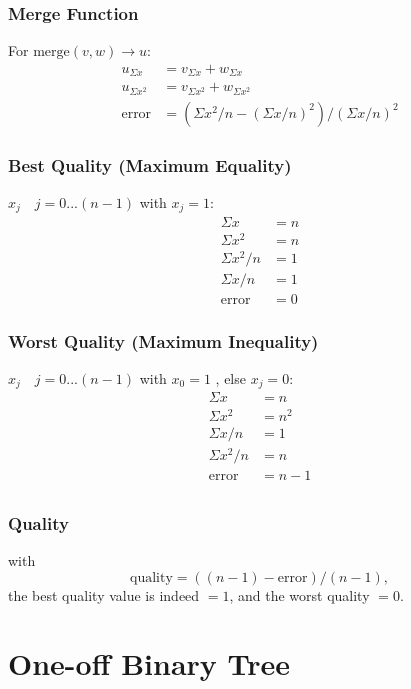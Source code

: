 \documentclass{article}
\theoremstyle{plain}
\begin{document}
\subsubsection*{Merge Function}

For $\text{merge}(v, w) \rightarrow u$:
\begin{align*}
    u_{\Sigma x} & = v_{\Sigma x} + w_{\Sigma x} \\
    u_{\Sigma x^2} & = v_{\Sigma x^2} + w_{\Sigma x^2} \\
    \text{error} & = (\Sigma x^2 / n - (\Sigma x / n)^2) / (\Sigma x / n)^2
\end{align*}

\subsubsection*{Best Quality (Maximum Equality)}
 $x_j \quad j = 0...(n-1)$ with $x_j = 1$:
\begin{align*}
    \Sigma x &  = n \\
    \Sigma x^2 & = n \\
    \Sigma x^2 / n & = 1 \\
    \Sigma x / n & = 1 \\
    \text{error} & = 0
\end{align*}

\subsubsection*{Worst Quality (Maximum Inequality)}
 $x_j \quad j = 0...(n-1)$ with $x_0 = 1$ , else $x_j = 0 $:
\begin{align*}
    \Sigma x &  = n \\
    \Sigma x^2 & = n^2 \\
    \Sigma x / n & = 1 \\
    \Sigma x^2 / n & = n \\
    \text{error} & = n - 1 \\
\end{align*}

\subsubsection*{Quality}
     with 
\[ 
\text{quality}  = ((n-1) - \text{error}) / (n-1),
\]
the best quality value is indeed $=1$, and the worst quality $=0$.
\section{One-off Binary Tree}
\end{document}
